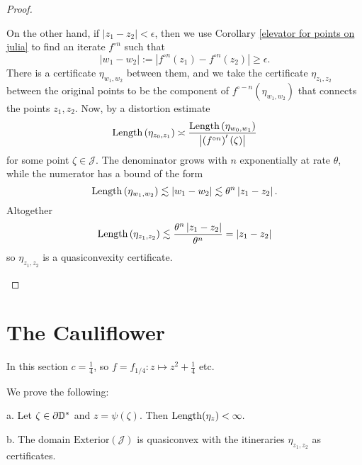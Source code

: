 \begin{proof}
\begin{enumerate}[label=(\roman*)]
On the other hand, if $\left|z_{1}-z_{2}\right|<\epsilon$, then
we use  Corollary \ref{elevator for points on julia} to find an iterate $f^{\circ n}$ such that 
\begin{equation}
	|w_1-w_2|:=\left|f^{\circ n}(z_{1})-f^{\circ n}(z_{2})\right|\geq\epsilon.
\end{equation}
There is a certificate $\eta_{w_1,w_2}$
between them, and we take the certificate $\eta_{z_{1},z_{2}}$ between the original points to be the component of $f^{\circ-n}\left(\eta_{w_1,w_2}\right)$
that connects the points $z_{1},z_{2}$. Now, by a distortion estimate
\begin{equation*}
\operatorname{Length}\left(\eta_{z_{0},z_{1}}\right)\asymp\frac{\operatorname{Length}\left(\eta_{w_0,w_1}\right)}{\left|\left(f^{\circ n}\right)'\left(\zeta\right)\right|}
\end{equation*}
 for some point $\zeta \in \mathcal{J}$. The denominator grows
with $n$ exponentially at rate $\theta$, while the numerator has
a bound of the form 
\[
\operatorname{Length}\left(\eta_{w_1,w_2}\right)\lesssim\left|w_1-w_2\right|\lesssim\theta^{n}\left|z_{1}-z_{2}\right|.
\]
Altogether 
\[
\operatorname{Length}\left(\eta_{z_{1},z_{2}}\right)\lesssim\frac{\theta^{n}\left|z_{1}-z_{2}\right|}{\theta^{n}}=\left|z_{1}-z_{2}\right|
\]
 so $\eta_{z_{1},z_{2}}$ is a quasiconvexity certificate.
\end{enumerate}
\end{proof}

\section{The Cauliflower}
In this section $c=\frac 14$, so $f=f_{1/4}: z\mapsto z^2+ \frac 14$ etc.

We prove the following:
\begin{theorem} \label{quasiconvex-cauliflower}
	a. Let $\zeta\in\partial{\mathbb{D}^*}$ and $z=\psi(\zeta)$. Then 
$	\operatorname{Length}(\eta_z)<\infty.$
	
    b. The domain $\mathrm{Exterior}(\mathcal{J})$ is quasiconvex with the itineraries $\eta_{z_1,z_2}$ as certificates.
\end{theorem}

\begin{comment}
Quantitatively, %
decompose the central itinerary into its constituent tracks $\eta_z = \gamma _1 +\gamma_2 +\ldots,$
then we have the bound $$
and decompose its central itinerary into tracks, 
$$\eta_\zeta = \gamma _1 +\gamma_2 +\ldots.$$
Then
$$\Length(\psi(\gamma_{k}))\lesssim\theta^{-k}$$ uniformly in
$\zeta$, for some constant $\theta=\theta(c)>1$.	
\end{comment}

